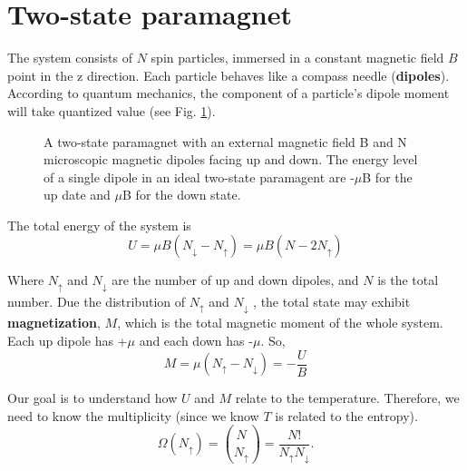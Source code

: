 
\section{Two-state paramagnet}
The system consists of $N$ spin particles, immersed in a constant magnetic field $B$ point in the z direction. Each particle behaves like a compass needle (\textbf{dipoles}). According to quantum mechanics, the component of a particle's dipole moment will take quantized value (see Fig. \ref{fig1}). 

\begin{figure}[h]
\centering
{}
\caption{A two-state paramagnet with an external magnetic field B and N microscopic magnetic dipoles facing up and down. The energy level of a single dipole in an
ideal two-state paramagent are -$\mu$B for the up date and $\mu$B for the down state.}
\label{fig1}

\end{figure}

The total energy of the system is
\begin{equation} \label{eq1} 
U = \mu B(N_{\downarrow} - N_{\uparrow}) = \mu B(N-2N_{\uparrow})
\end{equation}

Where $N_{\uparrow}$ and $N_{\downarrow}$ are the number of up and down dipoles, and $N$ is the total number. Due the distribution of $N_{\uparrow}$ and $N_{\downarrow}$ , the total state may exhibit \textbf{magnetization}, $M$, which is the total magnetic moment of the whole system. Each up dipole has +$\mu$ and each down has -$\mu$. So,
\begin{equation}
    M = \mu(N_{\uparrow} - N_{\downarrow}) = -\frac{U}{B}
\end{equation}

Our goal is to understand how $U$ and $M$ relate to the temperature. Therefore, we need to know the multiplicity (since we know $T$ is related to the entropy).
\begin{equation}
    \Omega(N_{\uparrow}) = \binom{N}{N_{\uparrow}} = \frac{N!}{N_{\uparrow}N_{\downarrow}}.
\end{equation}

